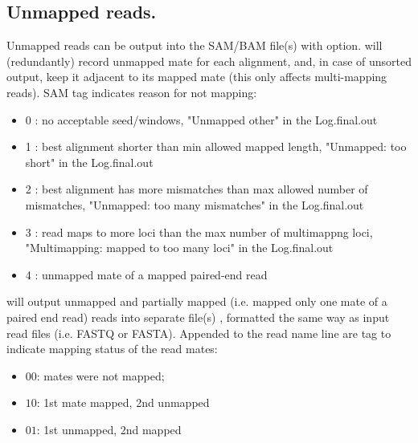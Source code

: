 \documentclass[12pt]{article}
\begin{document}
\subsection{Unmapped reads.}
Unmapped reads can be output into the SAM/BAM  file(s) with 
  option.   will (redundantly) record unmapped mate for each alignment, and, in case of unsorted output, keep it adjacent to its mapped mate (this only affects multi-mapping reads).
 SAM tag indicates reason for not mapping:
\begin{itemize}[noitemsep]
	\item[] 0 : no acceptable seed/windows, "Unmapped other" in the Log.final.out
	\item[] 1 : best alignment shorter than min allowed mapped length, "Unmapped: too short" in the Log.final.out
	\item[] 2 : best alignment has more mismatches than max allowed number of mismatches, "Unmapped: too many mismatches" in the Log.final.out
	\item[] 3 : read maps to more loci than the max number of multimappng loci, "Multimapping: mapped to too many loci" in the Log.final.out
	\item[] 4 : unmapped mate of a mapped paired-end read
\end{itemize}

  will output unmapped and partially mapped (i.e. mapped only one mate of a paired end read) reads into separate file(s) , formatted the same way as input read files (i.e. FASTQ or FASTA). Appended to the read name line are tag to indicate mapping status of the read mates:
\begin{itemize}[noitemsep,topsep=-3pt]
	\item[] $00$: mates were not mapped;
	\item[] $10$: 1st mate mapped, 2nd unmapped
	\item[] $01$: 1st unmapped, 2nd mapped
\end{itemize}
\end{document}
